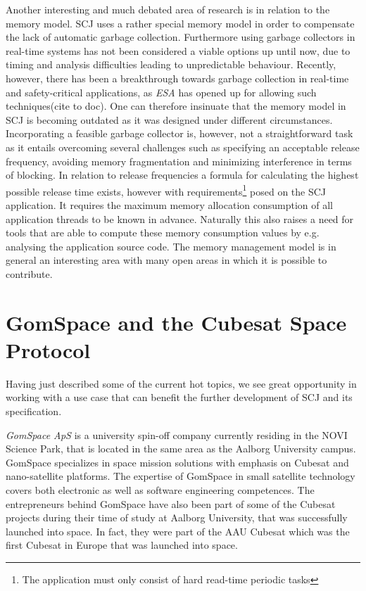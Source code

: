 Another interesting and much debated area of research is in relation to the memory model. SCJ uses a rather special memory model in order to compensate the lack of automatic garbage collection. Furthermore using garbage collectors in real-time systems has not been considered a viable options up until now, due to timing and analysis difficulties leading to unpredictable behaviour. Recently, however, there has been a breakthrough towards garbage collection in real-time and safety-critical applications, as \textit{ESA} has opened up for allowing such techniques(cite to doc). One can therefore insinuate that the memory model in SCJ is becoming outdated as it was designed under different circumstances. Incorporating a feasible garbage collector is, however, not a straightforward task as it entails overcoming several challenges such as specifying an acceptable release frequency, avoiding memory fragmentation and minimizing interference in terms of blocking. In relation to release frequencies a formula for calculating the highest possible release time exists, however with requirements\footnote{The application must only consist of hard read-time periodic tasks} posed on the SCJ application. It requires the maximum memory allocation consumption of all application threads to be known in advance\cite{Schoeberl:2007:GCS:1288940.1288953}. Naturally this also raises a need for tools that are able to compute these memory consumption values by e.g. analysing the application source code. The memory management model is in general an interesting area with many open areas in which it is possible to contribute.

\section{GomSpace and the Cubesat Space Protocol} %
\label{sec:gomspace_and_the_cubesat_space_protocol}
Having just described some of the current hot topics, we see great opportunity in working with a use case that can benefit the further development of SCJ and its specification.

\textit{GomSpace ApS} is a university spin-off company currently residing in the NOVI Science Park, that is located in the same area as the Aalborg University campus. GomSpace specializes in space mission solutions with emphasis on Cubesat and nano-satellite platforms\cite{GomSpace}. The expertise of GomSpace in small satellite technology covers both electronic as well as software engineering competences. The entrepreneurs behind GomSpace have also been part of some of the Cubesat projects during their time of study at Aalborg University, that was successfully launched into space. In fact, they were part of the AAU Cubesat which was the first Cubesat in Europe that was launched into space.


